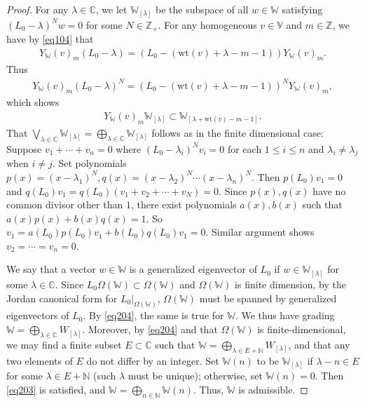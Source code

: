 \documentclass[12pt,b5paper,notitlepage]{report}
\theoremstyle{definition}
\theoremstyle{plain}
\newcommand{\Vbb}{\mathbb V}
\newcommand{\Wbb}{\mathbb W}
\newcommand{\Cbb}{\mathbb C}
\newcommand{\Nbb}{\mathbb N}
\newcommand{\Zbb}{\mathbb Z}
\newcommand{\wt}{\mathrm{wt}}
\numberwithin{equation}{section}
\begin{document}
\begin{proof}
For any $\lambda\in\Cbb$, we let $\Wbb_{[\lambda]}$ be the subspace of all $w\in \Wbb$ satisfying $(L_0-\lambda)^Nw=0$ for some $N\in\Zbb_+$. For any homogeneous $v\in\Vbb$ and $m\in\Zbb$, we have by \eqref{eq104} that
\begin{align*}
Y_\Wbb(v)_m(L_0-\lambda)=(L_0-(\wt(v)+\lambda-m-1))Y_\Wbb(v)_m.
\end{align*}
Thus
\begin{align}
Y_\Wbb(v)_m(L_0-\lambda)^N=(L_0-(\wt(v)+\lambda-m-1))^NY_\Wbb(v)_m,
\end{align}
which shows 
\begin{align}
Y_\Wbb(v)_m\Wbb_{[\lambda]}\subset\Wbb_{[\lambda+\wt(v)-m-1]}.\label{eq204}
\end{align}
That $\bigvee_{\lambda\in\Cbb}\Wbb_{[\lambda]}=\bigoplus_{\lambda\in\Cbb}\Wbb_{[\lambda]}$ follows as in the finite dimensional case: Suppose  $v_1+\cdots+v_n=0$ where $(L_0-\lambda_i)^Nv_i=0$ for each $1\leq i\leq n$ and $\lambda_i\neq \lambda_j$ when $i\neq j$. Set polynomials $p(x)=(x-\lambda_1)^N,q(x)=(x-\lambda_2)^N\cdots(x-\lambda_n)^N$. Then $p(L_0)v_1=0$ and $q(L_0)v_1=q(L_0)(v_1+v_2+\cdots+v_N)=0$. Since $p(x),q(x)$ have no common divisor other than $1$, there exist polynomials $a(x),b(x)$ such that $a(x)p(x)+b(x)q(x)=1$. So $v_1=a(L_0)p(L_0)v_1+b(L_0)q(L_0)v_1=0$. Similar argument shows $v_2=\cdots=v_n=0$.





We say that a vector $w\in\Wbb$ is a generalized eigenvector of $L_0$ if $w\in\Wbb_{[\lambda]}$ for some $\lambda\in\Cbb$. Since $L_0\Omega(\Wbb)\subset\Omega(\Wbb)$ and $\Omega(\Wbb)$ is finite dimension, by the Jordan canonical form for $L_0|_{\Omega(\Wbb)}$,  $\Omega(\Wbb)$ must be spanned by generalized eigenvectors of $L_0$. By \eqref{eq204}, the same is true for $\Wbb$. We thus have grading $\Wbb=\bigoplus_{\lambda\in\Cbb}W_{[\lambda]}$. Moreover, by \eqref{eq204} and that $\Omega(\Wbb)$ is finite-dimensional, we may find a finite subset $E\subset\Cbb$ such that $\Wbb=\bigoplus_{\lambda\in E+\Nbb}W_{[\lambda]}$, and that any two elements of $E$ do not differ by an integer.  Set $\Wbb(n)$ to be $\Wbb_{[\lambda]}$ if $\lambda-n\in E$ for some $\lambda\in E+\Nbb$ (such $\lambda$ must be unique); otherwise, set $\Wbb(n)=0$. Then \eqref{eq203} is satisfied, and $\Wbb=\bigoplus_{n\in\Nbb}\Wbb(n)$. Thus, $\Wbb$ is admissible.
\end{proof}
\end{document}
